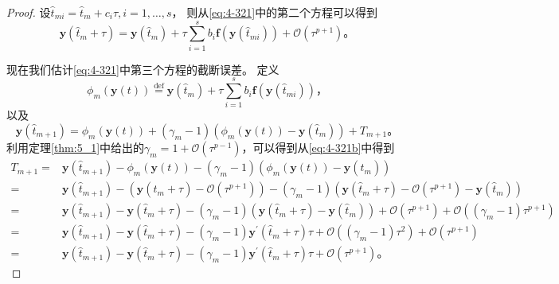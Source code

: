 \begin{proof}
	设$\hat{t}_{m i}=\hat{t}_m+c_i\tau, i=1, \ldots, s$，
	则从\eqref{eq:4-321}中的第二个方程可以得到
	\begin{equation}\label{eq:4-321b}
	\bm{y}\left(\hat{t}_m+\tau\right)=\bm{y}\left(\hat{t}_m\right)+\tau \sum_{i=1}^s b_i \bm{f}\left(\bm{y}\left(\hat{t}_{m i}\right)\right)+\mathcal{O}\left(\tau^{p+1}\right)。
	\end{equation}
	
	现在我们估计\eqref{eq:4-321}中第三个方程的截断误差。
	定义
	$$\phi_m(\bm{y}(t))\overset{\text{def}}{=}\bm{y}\left(\hat{t}_m\right)+\tau \sum\limits_{i=1}^s b_i \bm{f}\left(\bm{y}\left(\hat{t}_{m i}\right)\right)，$$
	以及
	\begin{equation}
	\bm{y}\left(\hat{t}_{m+1}\right)=\phi_m(\bm{y}(t))+\left(\gamma_m-1\right)\left(\phi_m(\bm{y}(t))-\bm{y}\left(\hat{t}_m\right)\right)+T_{m+1}。
	\end{equation}
	利用定理\ref{thm:5_1}中给出的$\gamma_m=1+\mathcal{O}\left(\tau^{p-1}\right)$，可以得到从\eqref{eq:4-321b}中得到
	\begin{equation}
	\begin{aligned}
	T_{m+1}= & \bm{y}\left(\hat{t}_{m+1}\right)-\phi_m(\bm{y}(t))-\left(\gamma_m-1\right)\left(\phi_m(\bm{y}(t))-\bm{y}\left(\hat{t}_m\right)\right) \\
	= & \bm{y}\left(\hat{t}_{m+1}\right)-\left(\bm{y}\left(\hat{t}_m+\tau\right)-\mathcal{O}(\tau^{p+1})\right)-\left(\gamma_m-1\right)\left(\bm{y}\left(\hat{t}_m+\tau\right)-\mathcal{O}(\tau^{p+1})-\bm{y}\left(\hat{t}_m\right)\right) \\
	= & \bm{y}\left(\hat{t}_{m+1}\right)-\bm{y}\left(\hat{t}_m+\tau\right)-\left(\gamma_m-1\right)\left(\bm{y}\left(\hat{t}_m+\tau\right)-\bm{y}\left(\hat{t}_m\right)\right)+\mathcal{O}(\tau^{p+1})+\mathcal{O}((\gamma_m-1) \tau^{p+1}) \\
	= & \bm{y}\left(\hat{t}_{m+1}\right)-\bm{y}\left(\hat{t}_m+\tau\right)-\left(\gamma_m-1\right) \bm{y}^{\prime}\left(\hat{t}_m+\tau\right) \tau+\mathcal{O}((\gamma_m-1) \tau^2)+\mathcal{O}(\tau^{p+1}) \\
	= & \bm{y}\left(\hat{t}_{m+1}\right)-\bm{y}\left(\hat{t}_m+\tau\right)-\left(\gamma_m-1\right) \bm{y}^{\prime}\left(\hat{t}_m+\tau\right) \tau+\mathcal{O}(\tau^{p+1})。
	\end{aligned}
	\end{equation}
	

\end{proof}
